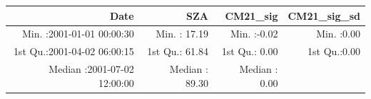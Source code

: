 \documentclass[
  10pt,
  a4paper,oneside]{article}
\begin{document}
\begin{longtable}[]{@{}rrrr@{}}
\toprule
\begin{minipage}[b]{0.34\columnwidth}\raggedleft
Date\strut
\end{minipage} & \begin{minipage}[b]{0.19\columnwidth}\raggedleft
SZA\strut
\end{minipage} & \begin{minipage}[b]{0.18\columnwidth}\raggedleft
CM21\_sig\strut
\end{minipage} & \begin{minipage}[b]{0.18\columnwidth}\raggedleft
CM21\_sig\_sd\strut
\end{minipage}\tabularnewline
\midrule
\endhead
\begin{minipage}[t]{0.34\columnwidth}\raggedleft
Min. :2001-01-01 00:00:30\strut
\end{minipage} & \begin{minipage}[t]{0.19\columnwidth}\raggedleft
Min. : 17.19\strut
\end{minipage} & \begin{minipage}[t]{0.18\columnwidth}\raggedleft
Min. :-0.02\strut
\end{minipage} & \begin{minipage}[t]{0.18\columnwidth}\raggedleft
Min. :0.00\strut
\end{minipage}\tabularnewline
\begin{minipage}[t]{0.34\columnwidth}\raggedleft
1st Qu.:2001-04-02 06:00:15\strut
\end{minipage} & \begin{minipage}[t]{0.19\columnwidth}\raggedleft
1st Qu.: 61.84\strut
\end{minipage} & \begin{minipage}[t]{0.18\columnwidth}\raggedleft
1st Qu.: 0.00\strut
\end{minipage} & \begin{minipage}[t]{0.18\columnwidth}\raggedleft
1st Qu.:0.00\strut
\end{minipage}\tabularnewline
\begin{minipage}[t]{0.34\columnwidth}\raggedleft
Median :2001-07-02 12:00:00\strut
\end{minipage} & \begin{minipage}[t]{0.19\columnwidth}\raggedleft
Median : 89.30\strut
\end{minipage} & \begin{minipage}[t]{0.18\columnwidth}\raggedleft
Median : 0.00\strut
\end{minipage} & \begin{minipage}[t]{0.18\columnwidth}\raggedleft

\end{minipage}
\end{longtable}
\end{document}
